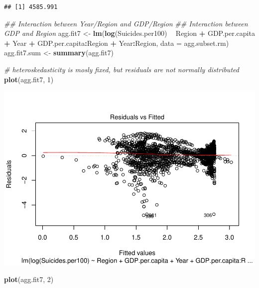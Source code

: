 \documentclass[11pt,]{article}
\newenvironment{Shaded}{\begin{snugshade}}{\end{snugshade}}
\newcommand{\CommentTok}[1]{\textcolor[rgb]{0.56,0.35,0.01}{\textit{#1}}}
\newcommand{\DataTypeTok}[1]{\textcolor[rgb]{0.13,0.29,0.53}{#1}}
\newcommand{\DecValTok}[1]{\textcolor[rgb]{0.00,0.00,0.81}{#1}}
\newcommand{\KeywordTok}[1]{\textcolor[rgb]{0.13,0.29,0.53}{\textbf{#1}}}
\newcommand{\NormalTok}[1]{#1}
\newcommand{\OperatorTok}[1]{\textcolor[rgb]{0.81,0.36,0.00}{\textbf{#1}}}
\newcommand{\StringTok}[1]{\textcolor[rgb]{0.31,0.60,0.02}{#1}}
\begin{document}
\begin{verbatim}
## [1] 4585.991
\end{verbatim}

\begin{Shaded}
\begin{Highlighting}[]
\CommentTok{## Interaction between Year/Region and GDP/Region}
\CommentTok{## Interaction between GDP and Region}
\NormalTok{agg.fit7 <-}\StringTok{ }\KeywordTok{lm}\NormalTok{(}\KeywordTok{log}\NormalTok{(Suicides.per100) }\OperatorTok{~}\StringTok{ }\NormalTok{Region }\OperatorTok{+}\StringTok{ }\NormalTok{GDP.per.capita }\OperatorTok{+}\StringTok{ }\NormalTok{Year }\OperatorTok{+}\StringTok{ }\NormalTok{GDP.per.capita}\OperatorTok{:}\NormalTok{Region }\OperatorTok{+}\StringTok{ }\NormalTok{Year}\OperatorTok{:}\NormalTok{Region, }\DataTypeTok{data =}\NormalTok{ agg.subset.rm)}
\NormalTok{agg.fit7.sum <-}\StringTok{ }\KeywordTok{summary}\NormalTok{(agg.fit7)}

\CommentTok{# heteroskedasticity is mosly fixed, but residuals are not normally distributed}
\KeywordTok{plot}\NormalTok{(agg.fit7, }\DecValTok{1}\NormalTok{)}
\end{Highlighting}
\end{Shaded}

\includegraphics{An-Analysis-of-Suicide-Data_files/figure-latex/unnamed-chunk-11-1.pdf}

\begin{Shaded}
\begin{Highlighting}[]
\KeywordTok{plot}\NormalTok{(agg.fit7, }\DecValTok{2}\NormalTok{)}
\end{Highlighting}
\end{Shaded}
\end{document}
